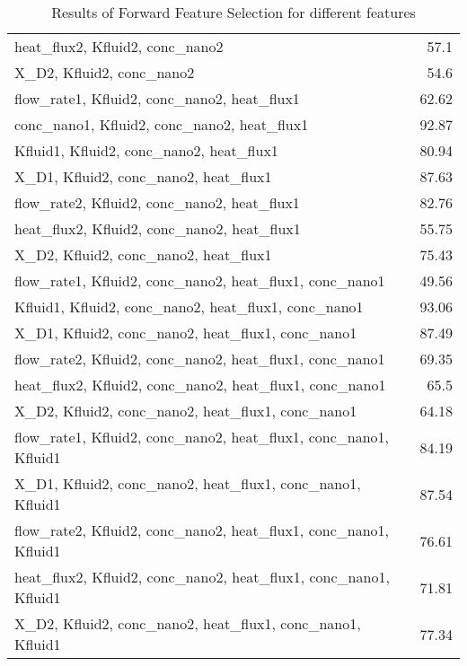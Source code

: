 \begin{table*}
\begin{tabular}{lr}
 heat\_flux2, Kfluid2, conc\_nano2                                    & 57.1  \\
 X\_D2, Kfluid2, conc\_nano2                                          & 54.6  \\
 flow\_rate1, Kfluid2, conc\_nano2, heat\_flux1                       & 62.62 \\
 conc\_nano1, Kfluid2, conc\_nano2, heat\_flux1                       & 92.87 \\
 Kfluid1, Kfluid2, conc\_nano2, heat\_flux1                           & 80.94 \\
 X\_D1, Kfluid2, conc\_nano2, heat\_flux1                             & 87.63 \\
 flow\_rate2, Kfluid2, conc\_nano2, heat\_flux1                       & 82.76 \\
 heat\_flux2, Kfluid2, conc\_nano2, heat\_flux1                       & 55.75 \\
 X\_D2, Kfluid2, conc\_nano2, heat\_flux1                             & 75.43 \\
 flow\_rate1, Kfluid2, conc\_nano2, heat\_flux1, conc\_nano1          & 49.56 \\
 Kfluid1, Kfluid2, conc\_nano2, heat\_flux1, conc\_nano1              & 93.06 \\
 X\_D1, Kfluid2, conc\_nano2, heat\_flux1, conc\_nano1                & 87.49 \\
 flow\_rate2, Kfluid2, conc\_nano2, heat\_flux1, conc\_nano1          & 69.35 \\
 heat\_flux2, Kfluid2, conc\_nano2, heat\_flux1, conc\_nano1          & 65.5  \\
 X\_D2, Kfluid2, conc\_nano2, heat\_flux1, conc\_nano1                & 64.18 \\
 flow\_rate1, Kfluid2, conc\_nano2, heat\_flux1, conc\_nano1, Kfluid1 & 84.19 \\
 X\_D1, Kfluid2, conc\_nano2, heat\_flux1, conc\_nano1, Kfluid1       & 87.54 \\
 flow\_rate2, Kfluid2, conc\_nano2, heat\_flux1, conc\_nano1, Kfluid1 & 76.61 \\
 heat\_flux2, Kfluid2, conc\_nano2, heat\_flux1, conc\_nano1, Kfluid1 & 71.81 \\
 X\_D2, Kfluid2, conc\_nano2, heat\_flux1, conc\_nano1, Kfluid1       & 77.34 \\
\hline
\end{tabular}
        \caption{Results of Forward Feature Selection for different features}
        \label{forward}
    \end{table*}
    
